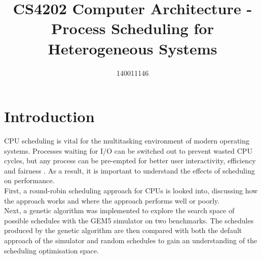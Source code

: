 \documentclass{article}
\title{CS4202 Computer Architecture - Process Scheduling for Heterogeneous Systems}
\author{140011146}
\newcommand{\n}[0]{\\[\baselineskip]}
\begin{document}
\maketitle

\section{Introduction}
CPU scheduling is vital for the multitasking environment of modern operating systems. Processes waiting for I/O can be switched out to prevent wasted CPU cycles, but any process can be pre-empted for better user interactivity, efficiency and fairness \cite{os}. As a result, it is important to understand the effects of scheduling on performance.
\n
First, a round-robin scheduling approach for CPUs is looked into, discussing how the approach works and where the approach performs well or poorly. 
\n
Next, a genetic algorithm was implemented to explore the search space of possible schedules with the GEM5 simulator on two benchmarks. The schedules produced by the genetic algorithm are then compared with both the default approach of the simulator and random schedules to gain an understanding of the scheduling optimisation space.
\end{document}
